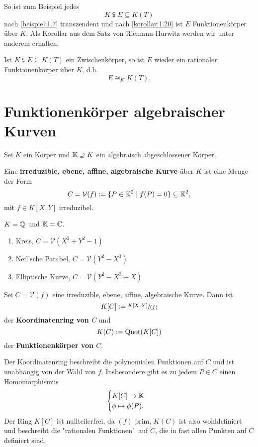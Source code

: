 \begin{bemerkungnr}
    So ist zum Beispiel jedes $$ K \subsetneqq E \subseteq K(T)$$
    nach \cref{beispiel:1.7} transzendent und nach \cref{korollar:1.20} ist $E$ Funktionenkörper
    über $K$. Als Korollar aus dem Satz von Riemann-Hurwitz werden wir unter anderem erhalten:
\end{bemerkungnr}
\begin{theorem}[Lüroth, 1875]
    Ist $K \subsetneqq E \subseteq K(T)$ ein Zwischenkörper, so ist $E$ wieder ein rationaler Funktionenkörper über $K$,
    d.h.
    $$ E \cong_K K(T). $$
\end{theorem}

\section{Funktionenkörper algebraischer Kurven}
Sei $K$ ein Körper und $\mathbb{K} \supseteq K$ ein algebraisch abgeschlossener Körper.

\begin{definition}
    Eine \textbf{irreduzible, ebene, affine, algebraische Kurve} über $K$ ist eine Menge der Form
    $$ C = \mathcal{V}(f) := \{P \in \mathbb{K}^2 \mid f(P) = 0\} \subseteq \mathbb{K}^2,$$
    mit $f \in K[X,Y]$ irreduzibel.
\end{definition}

\begin{beispiel}\label{beispiel:2.2}
    $K = \mathbb{Q}$ und $\mathbb{K} = \mathbb{C}$.
    \begin{enumerate}[label=\alph*)]
        \item Kreis, $C = \mathcal{V}(X^2 + Y^2 - 1)$
        \item Neil'sche Parabel, $C = \mathcal{V}(Y^2 - X^3)$
        \item Elliptische Kurve, $C = \mathcal{V}(Y^2 - X^3 + X)$
    \end{enumerate}
\end{beispiel}

\begin{definition}
    Sei $C = \mathcal{V}(f)$ eine irreduzible, ebene, affine, algebraische Kurve. 
    Dann ist $$ K[C] := \sfrac{K[X,Y]}{(f)} $$ der \textbf{Koordinatenring von $C$} und
    $$ K(C) := \operatorname{Quot}(K[C]) $$ der \textbf{Funktionenkörper von $C$}.
\end{definition}

\begin{bemerkungnr}
    Der Koordinatenring beschreibt die polynomialen Funktionen auf $C$ und ist unabhängig von der Wahl von $f$.
    Insbesondere gibt es zu jedem $P \in C$ einen Homomorphismus
    $$ \begin{cases}
        K[C] \to \mathbb{K} \\
        \phi \mapsto \phi(P).
    \end{cases}$$
    Der Ring $K[C]$ ist nullteilerfrei, da $(f)$ prim, $K(C)$ ist also wohldefiniert und beschreibt die 
    "rationalen Funktionen"\ auf $C$, die in fast allen Punkten auf $C$ definiert sind.
\end{bemerkungnr}

